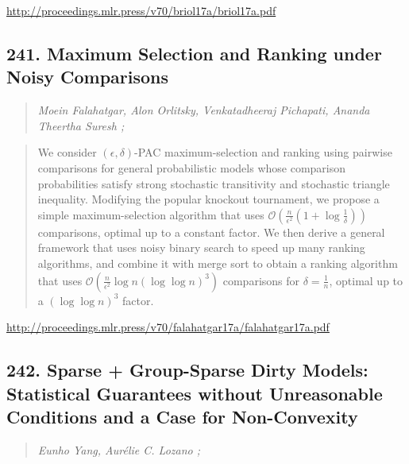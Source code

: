 \documentclass{article}
\begin{document}
\href{http://proceedings.mlr.press/v70/briol17a/briol17a.pdf}{http://proceedings.mlr.press/v70/briol17a/briol17a.pdf}

\subsection{241. Maximum Selection and Ranking under Noisy Comparisons}

\begin{quote}
\footnotesize{\textit{Moein Falahatgar, Alon Orlitsky, Venkatadheeraj Pichapati, Ananda Theertha Suresh ;}}

\end{quote}

\begin{quote}
    We consider $(\epsilon,\delta)$-PAC maximum-selection and ranking using pairwise comparisons for general probabilistic models whose comparison probabilities satisfy strong stochastic transitivity and stochastic triangle inequality. Modifying the popular knockout tournament, we propose a simple maximum-selection algorithm that uses $\mathcal{O}\left(\frac{n}{\epsilon^2} \left(1+\log \frac1{\delta}\right)\right)$ comparisons, optimal up to a constant factor. We then derive a general framework that uses noisy binary search to speed up many ranking algorithms, and combine it with merge sort to obtain a ranking algorithm that uses $\mathcal{O}\left(\frac n{\epsilon^2}\log n(\log \log n)^3\right)$ comparisons for $\delta=\frac1n$, optimal up to a $(\log \log n)^3$ factor.  
\end{quote}

\href{http://proceedings.mlr.press/v70/falahatgar17a/falahatgar17a.pdf}{http://proceedings.mlr.press/v70/falahatgar17a/falahatgar17a.pdf}

\subsection{242. Sparse + Group-Sparse Dirty Models: Statistical Guarantees without Unreasonable Conditions and a Case for Non-Convexity}

\begin{quote}
\footnotesize{\textit{Eunho Yang, Aurélie C. Lozano ;}}

\end{quote}
\end{document}
